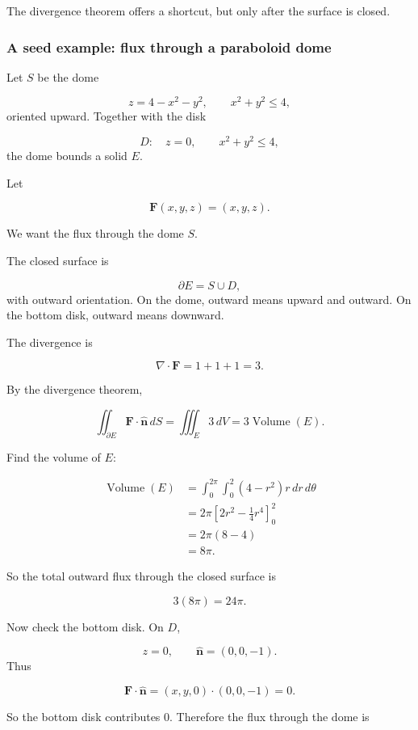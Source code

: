The divergence theorem offers a shortcut, but only after the surface is closed.

\subsubsection*{A seed example: flux through a paraboloid dome}

Let \(S\) be the dome

\[
    z=4-x^2-y^2,
    \qquad
    x^2+y^2\le4,
\]
oriented upward.  Together with the disk

\[
    D:\quad z=0,\qquad x^2+y^2\le4,
\]
the dome bounds a solid \(E\).

Let

\[
    \mathbf F(x,y,z)=(x,y,z).
\]

We want the flux through the dome \(S\).

The closed surface is

\[
    \partial E=S\cup D,
\]
with outward orientation.  On the dome, outward means upward and outward.  On the
bottom disk, outward means downward.

The divergence is

\[
    \nabla\cdot\mathbf F
    =
    1+1+1
    =
    3.
\]

By the divergence theorem,

\[
    \iint_{\partial E}\mathbf F\cdot\widehat{\mathbf n}\,dS
    =
    \iiint_E 3\,dV
    =
    3\operatorname{Volume}(E).
\]

Find the volume of \(E\):

\[
\begin{aligned}
\operatorname{Volume}(E)
&=
\int_0^{2\pi}\int_0^2(4-r^2)r\,dr\,d\theta\\
&=
2\pi\left[
2r^2-\frac14r^4
\right]_0^2\\
&=
2\pi(8-4)\\
&=
8\pi.
\end{aligned}
\]

So the total outward flux through the closed surface is

\[
    3(8\pi)=24\pi.
\]

Now check the bottom disk.  On \(D\),

\[
    z=0,
    \qquad
    \widehat{\mathbf n}=(0,0,-1).
\]
Thus

\[
    \mathbf F\cdot\widehat{\mathbf n}
    =
    (x,y,0)\cdot(0,0,-1)
    =
    0.
\]

So the bottom disk contributes \(0\).  Therefore the flux through the dome is

